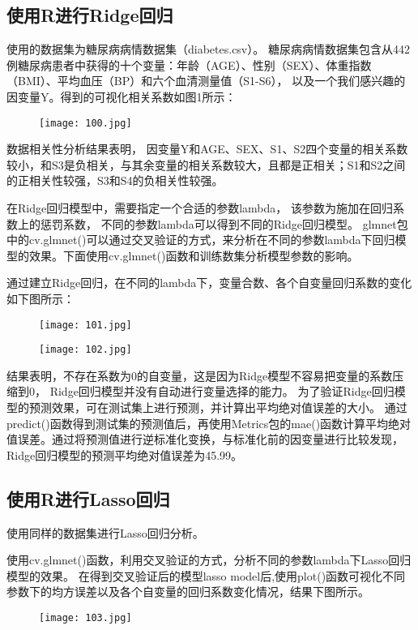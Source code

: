\documentclass[12pt]{article}
\begin{document}
\subsection{使用R进行Ridge回归}

使用的数据集为糖尿病病情数据集（diabetes.csv）。
糖尿病病情数据集包含从442例糖尿病患者中获得的十个变量：年龄（AGE）、性别（SEX）、体重指数（BMI）、平均血压（BP）和六个血清测量值（S1-S6），
以及一个我们感兴趣的因变量Y。得到的可视化相关系数如图1所示：

\begin{figure}[htbp]
	\centering
	\texttt{[image: 100.jpg]}
\end{figure}

数据相关性分析结果表明，
因变量Y和AGE、SEX、S1、S2四个变量的相关系数较小，和S3是负相关，与其余变量的相关系数较大，且都是正相关；S1和S2之间的正相关性较强，S3和S4的负相关性较强。

在Ridge回归模型中，需要指定一个合适的参数lambda，
该参数为施加在回归系数上的惩罚系数，
不同的参数lambda可以得到不同的Ridge回归模型。
glmnet包中的cv.glmnet()可以通过交叉验证的方式，来分析在不同的参数lambda下回归模型的效果。下面使用cv.glmnet()函数和训练数集分析模型参数的影响。

通过建立Ridge回归，在不同的lambda下，变量合数、各个自变量回归系数的变化如下图所示：
\begin{figure}[htbp]
	\centering
	\texttt{[image: 101.jpg]}
\end{figure}

\begin{figure}[htbp]
	\centering
	\texttt{[image: 102.jpg]}
\end{figure}

结果表明，不存在系数为0的自变量，这是因为Ridge模型不容易把变量的系数压缩到0，
Ridge回归模型并没有自动进行变量选择的能力。
为了验证Ridge回归模型的预测效果，可在测试集上进行预测，并计算出平均绝对值误差的大小。
通过predict()函数得到测试集的预测值后，再使用Metrics包的mae()函数计算平均绝对值误差。通过将预测值进行逆标准化变换，与标准化前的因变量进行比较发现，Ridge回归模型的预测平均绝对值误差为45.99。

\subsection{使用R进行Lasso回归}

使用同样的数据集进行Lasso回归分析。

使用cv.glmnet()函数，利用交叉验证的方式，分析不同的参数lambda下Lasso回归模型的效果。
在得到交叉验证后的模型lasso model后,使用plot()函数可视化不同参数下的均方误差以及各个自变量的回归系数变化情况，结果下图所示。
\begin{figure}[htbp]
	\centering
	\texttt{[image: 103.jpg]}
\end{figure}
\end{document}
